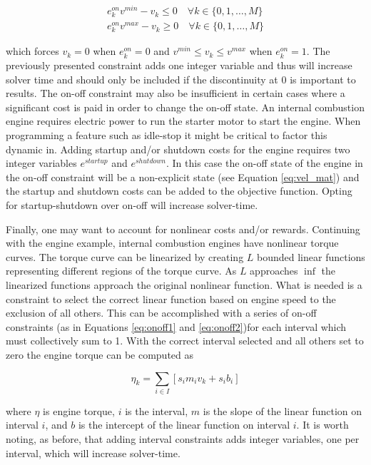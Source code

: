 \documentclass[12pt]{article}
\begin{document}
\begin{gather}
	e_k^{on}v^{min}-v_k\leq 0 \quad \forall k\in \{0,1,\dots,M\}\label{eq:onoff1}\\
	e_k^{on}v^{max}-v_k\geq 0 \quad \forall k\in \{0,1,\dots,M\}\label{eq:onoff2}
\end{gather}

which forces $v_k=0$ when $e_k^{on}=0$ and $v^{min}\leq v_k\leq v^{max}$ when $e_k^{on}=1$. The previously presented constraint adds one integer variable and thus will increase solver time and should only be included if the discontinuity at 0 is important to results. The on-off constraint may also be insufficient in certain cases where a significant cost is paid in order to change the on-off state. An internal combustion engine requires electric power to run the starter motor to start the engine. When programming a feature such as idle-stop it might be critical to factor this dynamic in. Adding startup and/or shutdown costs for the engine requires two integer variables $e^{startup}$ and $e^{shutdown}$. In this case the on-off state of the engine in the on-off constraint will be a non-explicit state (see Equation \eqref{eq:vel_mat}) and the startup and shutdown costs can be added to the objective function. Opting for startup-shutdown over on-off will increase solver-time.

Finally, one may want to account for nonlinear costs and/or rewards. Continuing with the engine example, internal combustion engines have nonlinear torque curves. The torque curve can be linearized by creating $L$ bounded linear functions representing different regions of the torque curve. As $L$ approaches $\inf$ the linearized functions approach the original nonlinear function. What is needed is a constraint to select the correct linear function based on engine speed to the exclusion of all others. This can be accomplished with a series of on-off constraints (as in Equations \eqref{eq:onoff1} and \eqref{eq:onoff2})for each interval which must collectively sum to 1. With the correct interval selected and all others set to zero the engine torque can be computed as

\begin{equation}
	\eta_k=\sum_{i\in I}[s_im_iv_k+s_ib_i]
\end{equation}

where $\eta$ is engine torque, $i$ is the interval, $m$ is the slope of the linear function on interval $i$, and $b$ is the intercept of the linear function on interval $i$. It is worth noting, as before, that adding interval constraints adds integer variables, one per interval, which will increase solver-time.
\end{document}
